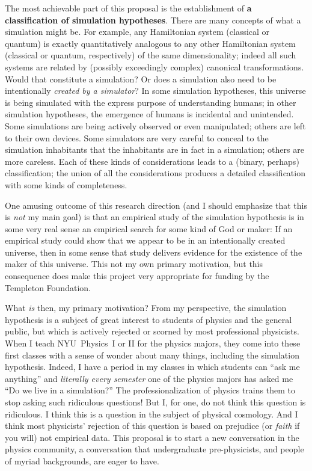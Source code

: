 \documentclass[12pt]{article}
\begin{document}
The most achievable part of this proposal is the establishment of \textbf{a classification of simulation hypotheses}.
There are many concepts of what a simulation might be.
For example, any Hamiltonian system (classical or quantum) is exactly quantitatively analogous to any other Hamiltonian system (classical or quantum, respectively) of the same dimensionality; indeed all such systems are related by (possibly exceedingly complex) canonical transformations.
Would that constitute a simulation? Or does a simulation also need to be intentionally \emph{created by a simulator}?
In some simulation hypotheses, this universe is being simulated with the express purpose of understanding humans; in other simulation hypotheses, the emergence of humans is incidental and unintended.
Some simulations are being actively observed or even manipulated; others are left to their own devices.
Some simulators are very careful to conceal to the simulation inhabitants that the inhabitants are in fact in a simulation; others are more careless.
Each of these kinds of considerations leads to a (binary, perhaps) classification; the union of all the considerations produces a detailed classification with some kinds of completeness.

One amusing outcome of this research direction (and I should emphasize that this is \emph{not} my main goal) is that an empirical study of the simulation hypothesis is in some very real sense an empirical search for some kind of God or maker:
If an empirical study could show that we appear to be in an intentionally created universe, then in some sense that study delivers evidence for the existence of the maker of this universe.
This not my own primary motivation, but this consequence does make this project very appropriate for funding by the Templeton Foundation.

What \emph{is} then, my primary motivation?
From my perspective, the simulation hypothesis is a subject of great interest to students of physics and the general public, but which is actively rejected or scorned by most professional physicists.
When I teach NYU~Physics~I or II for the physics majors, they come into these first classes with a sense of wonder about many things, including the simulation hypothesis.
Indeed, I have a period in my classes in which students can ``ask me anything'' and \emph{literally every semester} one of the physics majors has asked me ``Do we live in a simulation?''
The professionalization of physics trains them to stop asking such ridiculous questions!
But I, for one, do not think this question is ridiculous.
I think this is a question in the subject of physical cosmology.
And I think most physicists' rejection of this question is based on prejudice (or \emph{faith} if you will) not empirical data.
This proposal is to start a new conversation in the physics community, a conversation that undergraduate pre-physicists, and people of myriad backgrounds, are eager to have.
\end{document}

